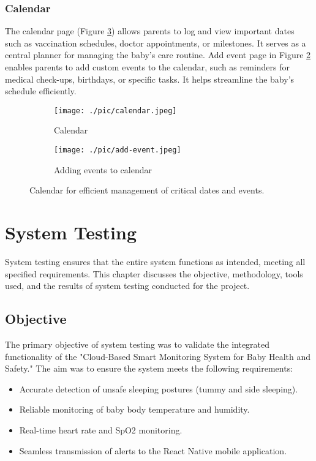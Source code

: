 \documentclass[12pt,a4paper]{report}
\begin{document}
\subsection{Calendar}
The calendar page (Figure \ref{fig:calendar}) allows parents to log and view important dates such as vaccination schedules, doctor appointments, or milestones. It serves as a central planner for managing the baby’s care routine.
Add event page in Figure \ref{fig:add-event} enables parents to add custom events to the calendar, such as reminders for medical check-ups, birthdays, or specific tasks. It helps streamline the baby’s schedule efficiently.
\begin{figure}[H]
  \centering
  \begin{subfigure}[b]{0.24\textwidth}
    \centering
    \texttt{[image: ./pic/calendar.jpeg]}
    \caption{Calendar}
    \label{fig:cal}
\end{subfigure}
  \hspace{0.1\textwidth}
  \begin{subfigure}[b]{0.23\textwidth} %
      \centering
      \texttt{[image: ./pic/add-event.jpeg]}
      \caption{Adding events to calendar}
      \label{fig:add-event}
  \end{subfigure}
  
  
  \caption{Calendar for efficient management of critical dates and events.}
    \label{fig:calendar}
\end{figure}
\chapter{System Testing}

System testing ensures that the entire system functions as intended, meeting all specified requirements. This chapter discusses the objective, methodology, tools used, and the results of system testing conducted for the project.

\section{Objective}
The primary objective of system testing was to validate the integrated functionality of the "Cloud-Based Smart Monitoring System for Baby Health and Safety." The aim was to ensure the system meets the following requirements:

\begin{itemize}
    \item Accurate detection of unsafe sleeping postures (tummy and side sleeping).
    \item Reliable monitoring of baby body temperature and humidity.
    \item Real-time heart rate and SpO2 monitoring.
    \item Seamless transmission of alerts to the React Native mobile application.
\end{itemize}
\end{document}

